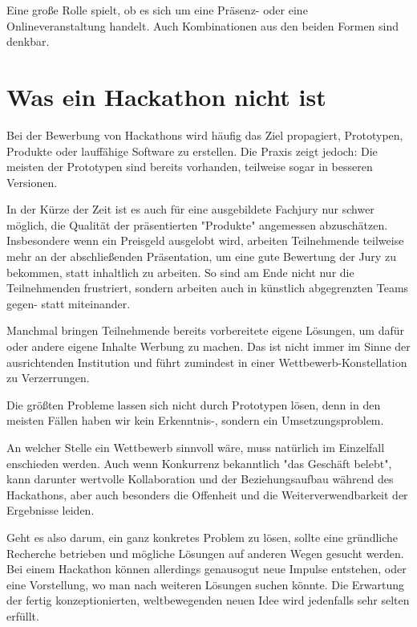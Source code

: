 Eine große Rolle spielt, ob es sich um eine Präsenz- oder eine Onlineveranstaltung handelt. Auch Kombinationen aus den beiden Formen sind denkbar.

\section{Was ein Hackathon nicht ist}


Bei der Bewerbung von Hackathons wird häufig das Ziel propagiert, Prototypen, Produkte oder lauffähige Software zu erstellen. Die Praxis zeigt jedoch: Die meisten der Prototypen sind bereits vorhanden, teilweise sogar in besseren Versionen.

In der Kürze der Zeit ist es auch für eine ausgebildete Fachjury nur schwer möglich, die Qualität der präsentierten "Produkte" angemessen abzuschätzen. Insbesondere wenn ein Preisgeld ausgelobt wird, arbeiten Teilnehmende teilweise mehr an der abschließenden Präsentation, um eine gute Bewertung der Jury zu bekommen, statt inhaltlich zu arbeiten. So sind am Ende nicht nur die Teilnehmenden frustriert, sondern arbeiten auch in künstlich abgegrenzten Teams gegen- statt miteinander.

Manchmal bringen Teilnehmende bereits vorbereitete eigene Lösungen, um dafür oder andere eigene Inhalte Werbung zu machen. Das ist nicht immer im Sinne der ausrichtenden Institution und führt zumindest in einer Wettbewerb-Konstellation zu Verzerrungen.

\begin{kaobox}Die größten Probleme lassen sich nicht durch Prototypen lösen, denn in den meisten Fällen haben wir kein Erkenntnis-, sondern ein Umsetzungsproblem.
\end{kaobox}

An welcher Stelle ein Wettbewerb sinnvoll wäre, muss natürlich im Einzelfall enschieden werden. Auch wenn Konkurrenz bekanntlich "das Geschäft belebt", kann darunter wertvolle Kollaboration und der Beziehungsaufbau während des Hackathons, aber auch besonders die Offenheit und die Weiterverwendbarkeit der Ergebnisse leiden.

Geht es also darum, ein ganz konkretes Problem zu lösen, sollte eine gründliche Recherche betrieben und mögliche Lösungen auf anderen Wegen gesucht werden. Bei einem Hackathon können allerdings genausogut neue Impulse entstehen, oder eine Vorstellung, wo man nach weiteren Lösungen suchen könnte. Die Erwartung der fertig konzeptionierten, weltbewegenden neuen Idee wird jedenfalls sehr selten erfüllt.

